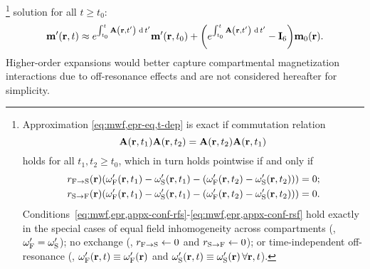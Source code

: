 \footnote{
Approximation \eqref{eq:mwf,epr-eq,t-dep} is exact 
if commutation relation
$$\bmA\paren{\bmr,t_1}\bmA\paren{\bmr,t_2} = \bmA\paren{\bmr,t_2} \bmA\paren{\bmr,t_1}$$
holds for all $t_1,t_2 \geq t_0$,
which in turn holds pointwise if and only if
\begin{align}
	\rfs\pr \paren{\ompf\paren{\bmr,t_1} - \omps\paren{\bmr,t_1} -
		\paren{\ompf\paren{\bmr,t_2} - \omps\paren{\bmr,t_2}}} &= 0;
		\label{eq:mwf,epr,appx-conf-rfs} \\
	\rsf\pr \paren{\ompf\paren{\bmr,t_1} - \omps\paren{\bmr,t_1} -
		\paren{\ompf\paren{\bmr,t_2} - \omps\paren{\bmr,t_2}}} &= 0.
		\label{eq:mwf,epr,appx-conf-rsf}
\end{align}
Conditions~\eqref{eq:mwf,epr,appx-conf-rfs}-\eqref{eq:mwf,epr,appx-conf-rsf} hold exactly
in the special cases 
of equal field inhomogeneity across compartments
(\ie, $\omega'_{\mathrm{F}} = \omega'_{\mathrm{S}}$);
no exchange 
(\ie, $r_{\mathrm{F}\to\mathrm{S}} \gets 0$ and $r_{\mathrm{S}\to\mathrm{F}} \gets 0$); 
or time-independent off-resonance 
(\ie, $\ompf\prt \equiv \ompf\pr$ and $\omps\prt \equiv \omps\pr\, \forall \bmr,t$).
}
solution for all $t \geq t_0$:
\begin{align}
	\bmmp\prt \approx
		e^{\int_{t_0}^t \bmA\paren{\bmr,t'} \der{t'}} \bmmp\paren{\bmr,t_0} +
		\paren{e^{\int_{t_0}^t \bmA\paren{\bmr,t'} \der{t'}} - \eye{6}} \bmmzero\pr.
	\label{eq:mwf,epr-eq,t-dep}
\end{align}
Higher-order expansions
would better capture compartmental magnetization interactions
due to off-resonance effects
and are not considered hereafter 
for simplicity.

